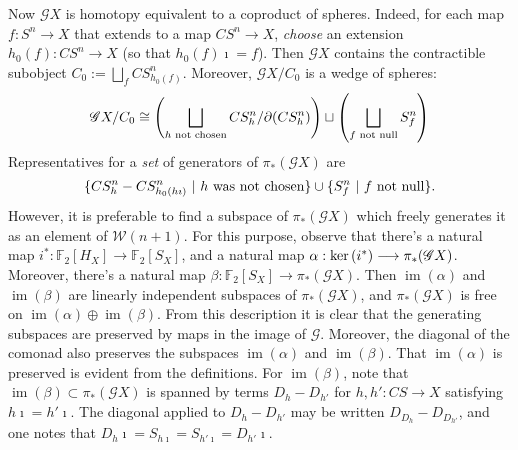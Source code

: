 \documentclass[11pt]{amsart}
\theoremstyle{plain}
\theoremstyle{definition}
\renewcommand{\ker}{\textup{ker}\,}
\DeclareMathOperator{\im}{im}
\renewcommand{\to}{\longrightarrow}
\newcommand{\scrQ}{\mathscr{Q}}
\newcommand{\scrR}{\mathscr{R}}
\newcommand{\scrT}{\mathscr{T}}
\newcommand{\scrY}{\mathscr{Y}}
\newcommand{\scrI}{\mathscr{I}}
\newcommand{\scrO}{\mathscr{O}}
\newcommand{\scrP}{\mathscr{P}}
\newcommand{\scrS}{\mathscr{S}}
\newcommand{\scrG}{\mathscr{G}}
\newcommand{\scrH}{\mathscr{H}}
\newcommand{\scrJ}{\mathscr{J}}
\newcommand{\scrK}{\mathscr{K}}
\newcommand{\scrL}{\mathscr{L}}
\newcommand{\scrZ}{\mathscr{Z}}
\newcommand{\scrN}{\mathscr{N}}
\newcommand{\scrM}{\mathscr{M}}
\newcommand{\calW}{\mathcal{W}}
\theoremstyle{plain}
\newcommand{\BSW}{{\scrG}}%
\newcommand{\F}{\mathbb{F}}
\begin{document}
\begin{comp func sseq old version}
Now $\BSW X$ is homotopy equivalent to a coproduct of spheres. Indeed, for each map $f:S^n\to X$ that extends to a map $CS^n\to X$, \emph{choose} an extension $h_0(f):CS^n\to X$ (so that $h_0(f)\imath=f$). Then $\BSW X$ contains the contractible subobject $C_0:=\bigsqcup_f CS^n_{h_0(f)}$. Moreover, $\BSW X/C_0$ is a wedge of spheres:
\[\BSW X/C_0\cong \left(\bigsqcup_{h\textup{ not chosen}}CS^n_h/\partial(CS^n_h)\right) \sqcup\left(\bigsqcup_{f\textup{ not null}}S^n_f\right)\]
Representatives for a \emph{set} of generators of $\pi_*(\BSW X)$ are 
\[\{CS^n_h-CS^n_{h_0(h\imath)}\ |\ \textup{$h$ was not chosen}\}\cup\{S^n_f\ |\ \textup{$f$ not null}\}.\]
However, it is preferable to find a subspace of $\pi_*(\BSW X)$ which freely generates it as an element of $\calW(n+1)$.
For this purpose, observe that there's a natural map $i^*:\F_2[H_X]\to \F_2[S_X]$, and a natural map $\alpha:\ker(i^*)\to\pi_*(\BSW X)$. Moreover, there's a natural map $\beta:\F_2[S_X]\to\pi_*(\BSW X)$. Then $\im (\alpha)$ and $\im (\beta)$ are linearly independent subspaces of $\pi_*(\BSW X)$, and $\pi_*(\BSW X)$ is free on $\im (\alpha)\oplus\im (\beta)$. From this description it is clear that the generating subspaces are preserved by maps in the image of $\BSW $. Moreover, the diagonal of the comonad also preserves the subspaces $\im (\alpha)$ and $\im (\beta)$. That $\im (\alpha)$ is preserved is evident from the definitions. For $\im (\beta)$, note that $\im (\beta)\subset\pi_*(\BSW X)$ is spanned by terms $D_h-D_{h'}$ for $h,h':CS\to X$ satisfying $h\imath=h'\imath$. The diagonal applied to $D_h-D_{h'}$ may be written $D_{D_h}-D_{D_{h'}}$, and one notes that $D_h\imath=S_{h\imath}=S_{h'\imath}=D_{h'}\imath$.


\end{comp func sseq old version}
\end{document}
